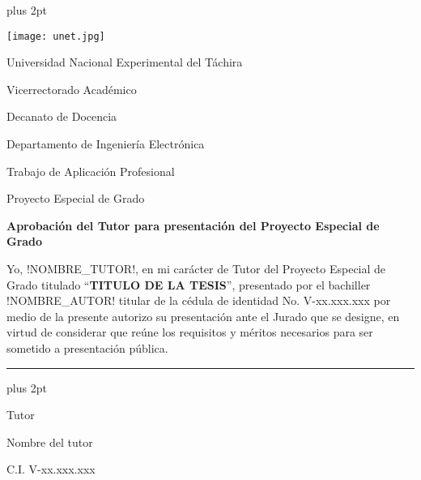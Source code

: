 % 

\begin{titlepage}
\parskip=7.25pt plus 2pt
\setcounter{page}{3}
\begin{center}
    \begin{spacing}{1}
    \texttt{[image: unet.jpg]}
    
    Universidad Nacional Experimental del Táchira 
    
    Vicerrectorado Académico
    
    Decanato de Docencia
    
    Departamento de Ingeniería Electrónica
    
    Trabajo de Aplicación Profesional
    
    Proyecto Especial de Grado
    \end{spacing}
\end{center}

\vspace{0.5cm}

\begin{center}
        
        \textbf{Aprobación del Tutor para presentación del Proyecto Especial de Grado}
        
\end{center}

\vspace{0.5cm}

\begin{spacing}{1.5}
    Yo, !NOMBRE\_TUTOR!, en mi carácter de Tutor del Proyecto Especial de Grado titulado \enquote{\textbf{TITULO DE LA TESIS}}, presentado por el bachiller !NOMBRE\_AUTOR! titular de la cédula de identidad No. \mbox{V-xx.xxx.xxx} por medio de la presente autorizo su presentación ante el Jurado que se designe, en virtud de considerar que reúne los requisitos y méritos necesarios para ser sometido a presentación pública.
\end{spacing}

\vfill

\begin{center}
    
    \rule{6cm}{1pt}
    
    \vspace{0.2cm}
    
    \parskip=0pt plus 2pt
    
    \begin{spacing}{1}
        Tutor
    
        Nombre del tutor
    
        C.I. V-xx.xxx.xxx
    \end{spacing}
    
\end{center}

\vspace{0.5cm}

\end{titlepage}
